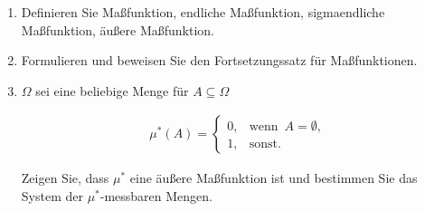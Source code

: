 
\begin{exercise}

\phantom{}

\begin{enumerate}[label = (\alph*)]

  \item
  Definieren Sie Maßfunktion, endliche Maßfunktion, sigmaendliche Maßfunktion, äußere Maßfunktion.

  \item
  Formulieren und beweisen Sie den Fortsetzungssatz für Maßfunktionen.
  
  \item
  $\Omega$ sei eine beliebige Menge für $A \subseteq \Omega$
  
  \begin{align*}
    \mu^\ast(A) =
    \begin{cases}
      0, & \text{wenn} \enspace A = \emptyset, \\
      1, & \text{sonst}.
    \end{cases}
  \end{align*}
  
  Zeigen Sie, dass $\mu^\ast$ eine äußere Maßfunktion ist und bestimmen Sie das System der $\mu^\ast$-messbaren Mengen.

\end{enumerate}

\end{exercise}


